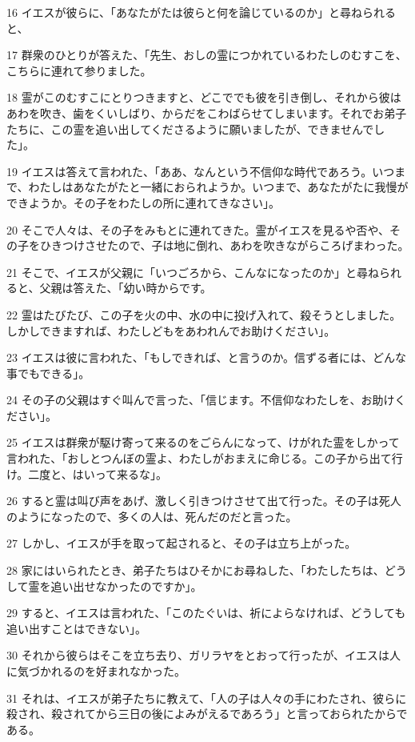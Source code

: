 \par 16 イエスが彼らに、「あなたがたは彼らと何を論じているのか」と尋ねられると、
\par 17 群衆のひとりが答えた、「先生、おしの霊につかれているわたしのむすこを、こちらに連れて参りました。
\par 18 霊がこのむすこにとりつきますと、どこででも彼を引き倒し、それから彼はあわを吹き、歯をくいしばり、からだをこわばらせてしまいます。それでお弟子たちに、この霊を追い出してくださるように願いましたが、できませんでした」。
\par 19 イエスは答えて言われた、「ああ、なんという不信仰な時代であろう。いつまで、わたしはあなたがたと一緒におられようか。いつまで、あなたがたに我慢ができようか。その子をわたしの所に連れてきなさい」。
\par 20 そこで人々は、その子をみもとに連れてきた。霊がイエスを見るや否や、その子をひきつけさせたので、子は地に倒れ、あわを吹きながらころげまわった。
\par 21 そこで、イエスが父親に「いつごろから、こんなになったのか」と尋ねられると、父親は答えた、「幼い時からです。
\par 22 霊はたびたび、この子を火の中、水の中に投げ入れて、殺そうとしました。しかしできますれば、わたしどもをあわれんでお助けください」。
\par 23 イエスは彼に言われた、「もしできれば、と言うのか。信ずる者には、どんな事でもできる」。
\par 24 その子の父親はすぐ叫んで言った、「信じます。不信仰なわたしを、お助けください」。
\par 25 イエスは群衆が駆け寄って来るのをごらんになって、けがれた霊をしかって言われた、「おしとつんぼの霊よ、わたしがおまえに命じる。この子から出て行け。二度と、はいって来るな」。
\par 26 すると霊は叫び声をあげ、激しく引きつけさせて出て行った。その子は死人のようになったので、多くの人は、死んだのだと言った。
\par 27 しかし、イエスが手を取って起されると、その子は立ち上がった。
\par 28 家にはいられたとき、弟子たちはひそかにお尋ねした、「わたしたちは、どうして霊を追い出せなかったのですか」。
\par 29 すると、イエスは言われた、「このたぐいは、祈によらなければ、どうしても追い出すことはできない」。
\par 30 それから彼らはそこを立ち去り、ガリラヤをとおって行ったが、イエスは人に気づかれるのを好まれなかった。
\par 31 それは、イエスが弟子たちに教えて、「人の子は人々の手にわたされ、彼らに殺され、殺されてから三日の後によみがえるであろう」と言っておられたからである。
